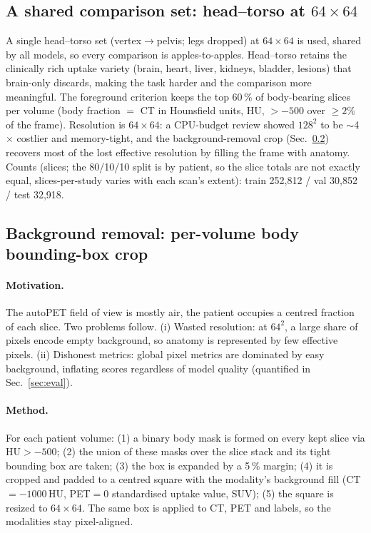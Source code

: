 \documentclass[11pt,a4paper]{article}
\newcommand{\num}[1]{#1}
\begin{document}
\subsection{A shared comparison set: head--torso at $64\times64$}
A single head--torso set (vertex$\to$pelvis; legs dropped) at $64\times64$ is used,
shared by all models, so every comparison is apples-to-apples. Head--torso retains the
clinically rich uptake variety (brain, heart, liver, kidneys, bladder, lesions) that
brain-only discards, making the task harder and the comparison more meaningful. The
foreground criterion keeps the top \num{60}\,\% of body-bearing slices per volume
(body fraction $=$ CT in Hounsfield units, HU, $>-500$ over $\ge2\%$ of the frame). Resolution is
$64\times64$: a CPU-budget review showed $128^2$ to be
$\sim$4$\times$ costlier and memory-tight, and the background-removal crop
(Sec.~\ref{sec:bgremoval}) recovers most of the lost effective resolution by filling
the frame with anatomy. Counts (slices; the 80/10/10 split is by patient, so the slice totals
are not exactly equal, slices-per-study varies with each scan's extent): train
\num{252{,}812} / val \num{30{,}852} / test \num{32{,}918}.

\subsection{Background removal: per-volume body bounding-box crop}
\label{sec:bgremoval}
\paragraph{Motivation.} The autoPET field of view is mostly air, the patient
occupies a centred fraction of each slice. Two problems follow. (i) Wasted
resolution: at $64^2$, a large share of pixels encode empty background, so anatomy is
represented by few effective pixels. (ii) Dishonest metrics: global pixel
metrics are dominated by easy background, inflating scores regardless of model quality
(quantified in Sec.~\ref{sec:eval}).

\paragraph{Method.} For each patient volume: (1) a binary body mask is formed on every
kept slice via $\text{HU} > -500$; (2) the union of these masks over
the slice stack and its tight bounding box are taken; (3) the box is expanded by a
\num{5}\,\% margin; (4) it is cropped and padded to a centred square with the
modality's background fill (CT$=-1000$\,HU, PET$=0$ standardised uptake value, SUV); (5) the square is resized to
$64\times64$. The same box is applied to CT, PET and labels, so the modalities stay
pixel-aligned.
\end{document}
